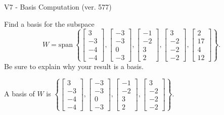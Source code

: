 \begin{exercise}
  \begin{exerciseTitle}V7 - Basis Computation (ver. 577)\end{exerciseTitle}
  \begin{exerciseStatement}
    Find a basis for the subspace 
\[W=\mathrm{span}\ \left\{\left[\begin{array}{r}
3 \\
-3 \\
-4 \\
-4
\end{array}\right] , \left[\begin{array}{r}
-3 \\
-3 \\
0 \\
-3
\end{array}\right] , \left[\begin{array}{r}
-1 \\
-2 \\
3 \\
2
\end{array}\right] , \left[\begin{array}{r}
3 \\
-2 \\
-2 \\
-2
\end{array}\right] , \left[\begin{array}{r}
2 \\
17 \\
4 \\
12
\end{array}\right]\right\}.\]
 Be sure to explain why your result is a basis.


  \end{exerciseStatement}
  \begin{exerciseAnswer}
   A basis of \(W\) is  \(\left\{\left[\begin{array}{r}
3 \\
-3 \\
-4 \\
-4
\end{array}\right] , \left[\begin{array}{r}
-3 \\
-3 \\
0 \\
-3
\end{array}\right] , \left[\begin{array}{r}
-1 \\
-2 \\
3 \\
2
\end{array}\right] , \left[\begin{array}{r}
3 \\
-2 \\
-2 \\
-2
\end{array}\right]\right\}\).
  


  \end{exerciseAnswer}
\end{exercise}
